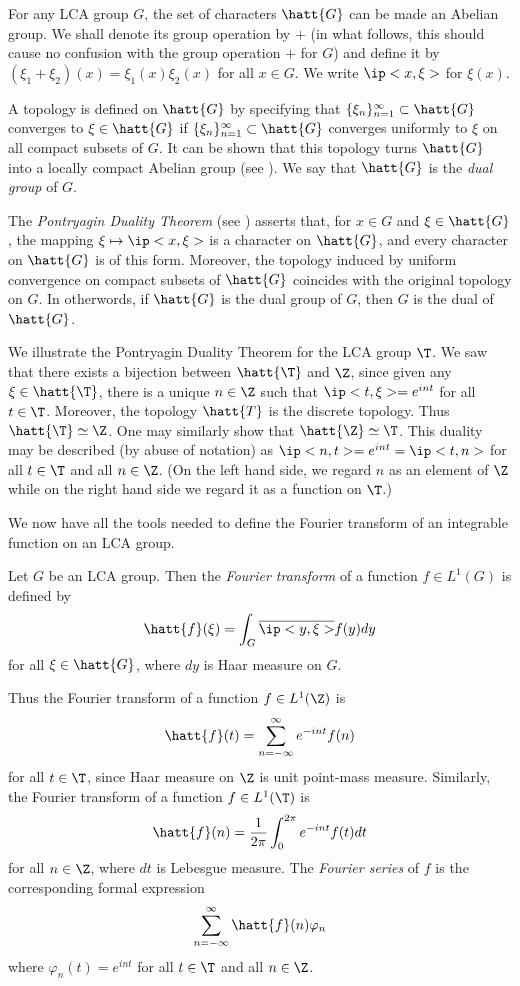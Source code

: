 For any LCA group $G$, the set of characters $\hatt{G}$ can be made
an Abelian group. We shall denote its group operation by $+$ (in what follows,
this should cause no confusion with the group operation $+$ for $G$) and
define it by $(\xi_1+\xi_2)(x)=\xi_1(x)\xi_2(x)$ for all $x\in G$.
We write $\ip<x,\xi>$ for $\xi(x)$.

A topology is defined on $\hatt{G}$ by specifying that
$\{\xi_n\}_{n=1}^{\infty}\subset\hatt{G}$ converges to $\xi\in\hatt{G}$ if
$\{\xi_n\}_{n=1}^{\infty}\subset\hatt{G}$ converges uniformly to $\xi$ on all
compact subsets of $G$. It can be shown that this topology turns $\hatt{G}$ into
a locally compact Abelian group (see \cite[Chapter VII, \S 3]{Katznelson}).
We say that $\hatt{G}$ is the {\em dual group}
of $G$.

The {\em Pontryagin Duality Theorem} (see \cite[p.189]{Katznelson}) asserts
that, for $x\in G$
and $\xi\in\hatt{G}$, the mapping $\xi\mapsto \ip<x,\xi>$ is a character on
$\hatt{G}$, and every character on $\hatt{G}$ is of this form. Moreover, the
topology induced by uniform convergence on compact subsets of $\hatt{G}$
coincides with the original topology on $G$. In otherwords, if $\hatt{G}$ is the
dual group of $G$, then $G$ is the dual of $\hatt{G}$.

We illustrate the Pontryagin Duality Theorem for the LCA group $\T$.
We saw that there exists a
bijection between $\hatt{\T}$ and $\Z$, since given any $\xi\in\hatt{\T}$, there
is a unique $n\in\Z$ such that $\ip<t,\xi>=e^{int}$ for all $t\in\T$.
Moreover, the topology $\hatt{T}$ is the
discrete topology. Thus $\hatt{\T}\simeq\Z$. One may similarly show that
$\hatt{\Z}\simeq\T$. This duality may be described (by abuse of notation) as
$\ip<n,t>=e^{int}=\ip<t,n>$ for
all $t\in\T$ and all $n\in\Z$. (On
the left hand side, we regard $n$ as an element of $\Z$ while on the right
hand side we regard it as a function on $\T$.)

We now have all the tools needed to define the Fourier transform of an
integrable
function on an LCA group.

\begin{definition}\label{Fourier transf}
Let $G$ be an LCA group. Then the {\em
Fourier transform} of a function $f\in L^1(G)$ is defined by
\[\hatt{f}(\xi) = \int_G \overline{\ip<y,\xi>}f(y)dy\]
for all $\xi\in\hatt{G}$, where $dy$ is Haar measure on $G$.
\end{definition}

Thus the Fourier transform of a function $f\in L^1(\Z)$ is
\[\hatt{f}(t)=\sum_{n=-\infty}^{\infty}e^{-int}f(n)\]
for all $t\in\T$, since Haar measure on $\Z$ is unit point-mass measure.
Similarly, the Fourier transform of a function $f\in L^1(\T)$ is
\[\hatt{f}(n) = \frac{1}{2\pi}\int_0^{2\pi}e^{-int}f(t)dt\]
for all $n\in\Z$, where $dt$ is Lebesgue measure. The {\em Fourier series} of
$f$ is the corresponding formal expression
\[\sum_{n=-\infty}^{\infty}\hatt{f}(n)\varphi_n\]
where $\varphi_n(t)=e^{int}$ for all $t\in\T$ and all $n\in\Z$.


